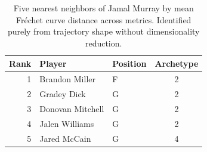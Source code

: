 \begin{table}[htbp]
  \centering\small
  \begin{tabular}{rllc}
    \toprule
    Rank & Player & Position & Archetype \\
    \midrule
    1 & Brandon Miller & F & 2 \\
    2 & Gradey Dick & G & 2 \\
    3 & Donovan Mitchell & G & 2 \\
    4 & Jalen Williams & G & 2 \\
    5 & Jared McCain & G & 4 \\
    \bottomrule
  \end{tabular}
  \caption{Five nearest neighbors of Jamal Murray by mean Fr\'{e}chet curve distance across metrics. Identified purely from trajectory shape without dimensionality reduction.}
  \label{tab:Jamal_Murray_frechet_curve_neighbors}
\end{table}

